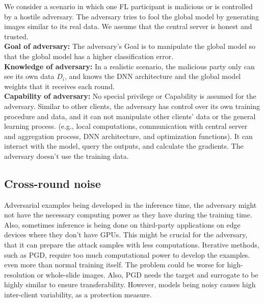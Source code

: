 We consider a scenario in which one FL participant is malicious or is controlled by a hostile adversary. The adversary tries to fool the global model by generating images similar to its real data.
We assume that the central server is honest and trusted.\\\textbf{Goal of adversary:}
The adversary's Goal is to manipulate the global model so that the global model has a higher classification error.  \\
\textbf{Knowledge of adversary:}
In a realistic scenario, the malicious party only can see its own data $D_{i}$, and knows the DNN architecture and the global model weights that it receives each round. \\
\textbf{Capability of adversary:}
No special privilege or Capability is assumed for the adversary. Similar to other clients, the adversary has control over its own training procedure and data, and it can not manipulate other clients' data or the general learning process. (e.g., local computations, communication with central server and aggregation process, DNN architecture, and optimization functions). It can interact with the model, query the outputs, and calculate the gradients. The adversary doesn't use the training data.




\subsection{Cross-round noise}



Adversarial examples being developed in the inference time, the adversary might not have the necessary computing power as they have during the training time. Also, sometimes inference is being done on third-party applications on edge devices where they don't have GPUs.
This might be crucial for the adversary, that it can prepare the attack samples with less computations. Iterative methods, such as PGD, require too much computational power to develop the examples. even more than normal training itself. \cite{zhang2019you} The problem could be worse for high-resolution or whole-slide images.
Also, PGD needs the target and surrogate to be highly similar to ensure transferability. However, models being noisy causes high inter-client variability, as a protection measure.




